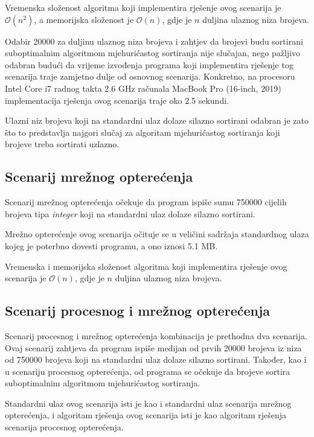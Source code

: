 \documentclass[times, utf8, diplomski]{fer}
\begin{document}
Vremenska složenost algoritma koji implementira rješenje ovog scenarija je $\mathcal{O}(n^2)$, a memorijska složenost je $\mathcal{O}(n)$, gdje je $n$ duljina ulaznog niza brojeva.

Odabir 20000 za duljinu ulaznog niza brojeva i zahtjev da brojevi budu sortirani suboptimalnim algoritmom mjehurićastog sortiranja nije slučajan, nego pažljivo odabran budući da vrijeme izvođenja programa koji implementira rješenje tog scenarija traje zamjetno dulje od osnovnog scenarija. Konkretno, na procesoru Intel Core i7 radnog takta 2.6 GHz računala MacBook Pro (16-inch, 2019)  implementacija rješenja ovog scenarija traje oko 2.5 sekundi.

Ulazni niz brojeva koji na standardni ulaz dolaze silazno sortirani odabran je zato što to predstavlja najgori slučaj  za algoritam mjehurićastog sortiranja koji brojeve treba sortirati uzlazno.

\subsection{Scenarij mrežnog opterećenja}
Scenarij mrežnog opterećenja očekuje da program ispiše sumu 750000 cijelih brojeva tipa \textit{integer} koji na standardni ulaz dolaze silazno sortirani.

Mrežno opterećenje ovog scenarija očituje se u veličini sadržaja standardnog ulaza kojeg je poterbno dovesti programu, a ono iznosi 5.1 MB.

Vremenska i memorijska složenost algoritma koji implementira rješenje ovog scenarija je $\mathcal{O}(n)$, gdje je $n$ duljina ulaznog niza brojeva.

\subsection{Scenarij procesnog i mrežnog opterećenja}
Scenarij procesnog i mrežnog opterećenja kombinacija je prethodna dva scenarija. Ovaj scenarij zahtjeva da program ispiše medijan od prvih 20000 brojeva iz niza od 750000 brojeva koji na standardni ulaz dolaze silazno sortirani. Također, kao i u scenariju procesnog opterećenja, od programa se očekuje da brojeve sortira suboptimalnim algoritmom mjehurićastog sortiranja.

Standardni ulaz ovog scenarija isti je kao i standardni ulaz scenarija mrežnog opterećenja, i algoritam rješenja ovog scenarija isti je kao algoritam rješenja scenarija procesnog opterećenja.
\end{document}
